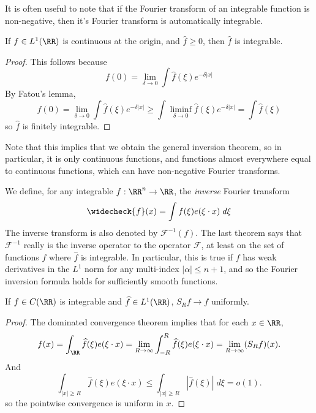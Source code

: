 It is often useful to note that if the Fourier transform of an integrable function is non-negative, then it's Fourier transform is automatically integrable.

\begin{theorem}
   If $f \in L^1(\RR)$ is continuous at the origin, and $\widehat{f} \geq 0$, then $\widehat{f}$ is integrable.
\end{theorem}
\begin{proof}
   This follows because
   \[ f(0) = \lim_{\delta \to 0} \int \widehat{f}(\xi) e^{-\delta |x|} \]
   By Fatou's lemma,
   \[ f(0) = \lim_{\delta \to 0} \int \widehat{f}(\xi) e^{-\delta |x|} \geq \int \liminf_{\delta \to 0} \widehat{f}(\xi) e^{-\delta |x|} = \int \widehat{f}(\xi) \]
   so $\widehat{f}$ is finitely integrable.
\end{proof}

Note that this implies that we obtain the general inversion theorem, so in particular, it is only continuous functions, and functions almost everywhere equal to continuous functions, which can have non-negative Fourier transforms.

We define, for any integrable $f: \RR^n \to \RR$, the \emph{inverse} Fourier transform
%
\[ \widecheck{f}(x) = \int f(\xi) e(\xi \cdot x)\; d\xi \]
%
The inverse transform is also denoted by $\mathcal{F}^{-1}(f)$. The last theorem says that $\mathcal{F}^{-1}$ really is the inverse operator to the operator $\mathcal{F}$, at least on the set of functions $f$ where $\widehat{f}$ is integrable. In particular, this is true if $f$ has weak derivatives in the $L^1$ norm for any multi-index $|\alpha| \leq n+1$, and so the Fourier inversion formula holds for sufficiently smooth functions.

\begin{corollary}
    If $f \in C(\RR)$ is integrable and $\widehat{f} \in L^1(\RR)$, $S_R f \to f$ uniformly.
\end{corollary}
\begin{proof}
    The dominated convergence theorem implies that for each $x \in\RR$,
    \[ f(x) = \int_{\RR} \widehat{f}(\xi) e(\xi \cdot x) = \lim_{R \to \infty} \int_{-R}^R \widehat{f}(\xi) e(\xi \cdot x) = \lim_{R \to \infty} (S_R f)(x). \]
    And
    \[ \int_{|x| \geq R} \widehat{f}(\xi) e(\xi \cdot x) \leq \int_{|x| \geq R} |\widehat{f}(\xi)|\; d\xi = o(1). \]
    so the pointwise convergence is uniform in $x$.
\end{proof}

